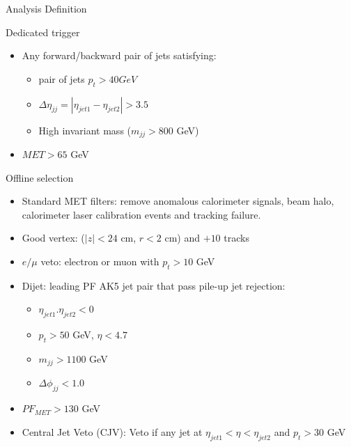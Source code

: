 \documentclass[8pt]{beamer}
\begin{document}
\begin{frame}{Analysis Definition}
 
\begin{block}{Dedicated trigger}
 
\begin{itemize}
 \item Any forward/backward pair of jets satisfying:
 \begin{itemize}
  \item pair of jets $p_t>40 GeV$
  \item $\Delta\eta_{jj} = | \eta_{jet1} - \eta_{jet2}| > 3.5$
  \item High invariant mass ($m_{jj}>800$ GeV)
 \end{itemize}
 \item $MET>65$ GeV
\end{itemize}
 
\end{block}

\begin{block}{Offline selection}
 
\begin{itemize}
 \item Standard MET filters: remove anomalous calorimeter signals, beam halo, calorimeter laser calibration events and tracking failure. 
 \item Good vertex: ($|z|<24$ cm, $r<2$ cm) and $+10$ tracks
 \item $e/\mu$ veto: electron or muon with $p_t>10$ GeV
 
 \item Dijet: leading PF AK5 jet pair that pass pile-up jet rejection:
 \begin{itemize}
  \item $\eta_{jet1} . \eta_{jet2} < 0$
  \item $p_t > 50$ GeV, $\eta < 4.7$
  \item $m_{jj}>1100$ GeV
  \item $\Delta\phi_{jj} < 1.0$
 \end{itemize}

 \item $PF_{MET} > 130$ GeV
 
 \item Central Jet Veto (CJV): Veto if any jet at $\eta_{jet1} < \eta < \eta_{jet2}$ and $p_t>30$ GeV
 
\end{itemize}
 
 
\end{block}
 
\end{frame}
\end{document}
